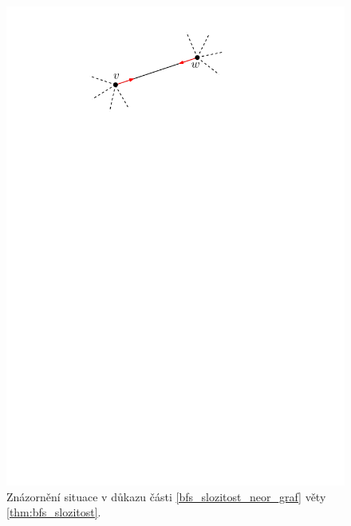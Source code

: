 \begin{figure}[h]
    \centering
    \includegraphics[scale=.7]{01-grafalgo/images/ch01_zapocitavani_hran.pdf}
    \caption{Znázornění situace v důkazu části \ref{bfs_slozitost_neor_graf} věty \ref{thm:bfs_slozitost}.}
\end{figure}